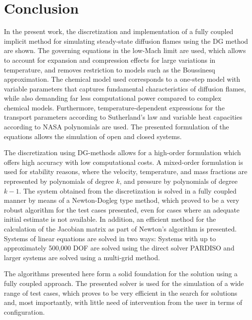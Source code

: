 \chapter{Conclusion}	\label{ch:conclusion}

In the present work, the discretization and implementation of a fully coupled implicit method for simulating steady-state diffusion flames using the DG method are shown. The governing equations in the low-Mach limit are used, which allows to account for expansion and compression effects for large variations in temperature, and removes restriction to models such as the Boussinesq approximation. The chemical model used corresponds to a one-step model with variable parameters that captures fundamental characteristics of diffusion flames, while also demanding far less computational power compared to complex chemical models. Furthermore, temperature-dependent expressions for the transport parameters according to Sutherland's law and variable heat capacities according to NASA polynomials are used. The presented formulation of the equations allows the simulation of open and closed systems. 

The discretization using DG-methods allows for a high-order formulation which offers high accuracy with low computational costs. A mixed-order formulation is used for stability reasons, where the velocity, temperature, and mass fractions are represented by polynomials of degree $k$, and pressure by polynomials of degree $k-1$. The system obtained from the discretization is solved in a fully coupled manner by means of a Newton-Dogleg type method, which proved to be a very robust algorithm for the test cases presented, even for cases where an adequate initial estimate is not available. In addition, an efficient method for the calculation of the Jacobian matrix as part of Newton's algorithm is presented. Systems of linear equations are solved in two ways: Systems with up to approximately 500,000 \gls{DOF} are solved using the direct solver \gls{PARDISO} and larger systems are solved using a multi-grid method. 

The algorithms presented here form a solid foundation for the solution using a fully coupled approach. The presented solver is used for the simulation of a wide range of test cases, which proves to be very efficient in the search for solutions and, most importantly, with little need of intervention from the user in terms of configuration.

